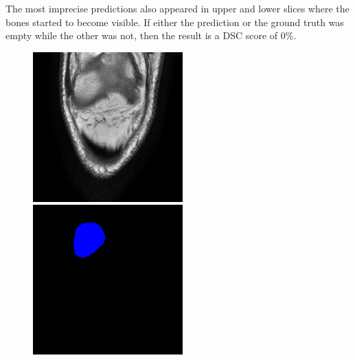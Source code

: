 The most imprecise predictions also appeared in upper and lower slices where the bones started to become visible. If either the prediction or the ground truth was empty while the other was not, then the result is a DSC score of 0\%.

\begin{figure}[H]
  \includegraphics[width=\linewidth]{imgs/a8.png}
\endminipage\hfill
{}
  \includegraphics[width=\linewidth]{imgs/b8.png}

\end{figure}
